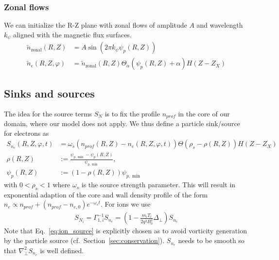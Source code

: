 \subsubsection{Zonal flows}
We can initialize the R-Z plane with zonal flows of amplitude $A$ and
wavelength $k_\psi$ aligned with the magnetic flux surfaces.
\begin{align} \label{eq:initial_zonal_flow}
    \tilde n_{\text{zonal}}(R,Z) &= A \sin (2\pi k_\psi \psi_p(R,Z)) \nonumber\\
\tilde n_e(R,Z,\varphi) &= \tilde n_{\text{zonal}}(R,Z)\Theta_{\alpha}(\psi_p(R, Z)+\alpha) H(Z-Z_X)
\end{align}

\subsection{Sinks and sources} \label{sec:sources}
The idea for the source terms $S_N$ is to fix the profile $n_{prof}$ in the
core of our domain, where our model does not apply.
We thus define a particle sink/source for electrons as
\begin{align} \label{eq:electron_source}
  S_{n_e}(R,Z,\varphi, t) &= \omega_s
    (n_{prof}(R,Z) - n_e(R,Z,\varphi, t))\Theta( \rho_{s} -\rho(R,Z)) H(Z-Z_X)\\
    \rho(R,Z) &:= \frac{\psi_{p,\min}- \psi_p(R,Z) }{\psi_{p,\min}},\\
    \psi_p(R,Z)&:= (1-\rho(R,Z))\psi_{p,\min}
\end{align}
with $0 < \rho_{s}<1$
where $\omega_s$ is the source strength parameter.
This will result in exponential adaption of the core and wall
density profile of the form $n_e \propto n_{prof}+(n_{prof}-n_{e,0})e^{-\omega_st}$.
For ions we use
\begin{align}
    S_{N_i} = \Gamma_{1,i}^{-1} S_{n_e} = \left(1-\frac{m_i T_i}{2q^2 B_0^2} \Delta_\perp\right) S_{n_e}
  \label{eq:ion_source}
\end{align}
Note that Eq.~\eqref{eq:ion_source} is explicitly chosen as to avoid vorticity generation
by the particle source (cf.~Section~\ref{sec:conservation}). $S_{n_e}$ needs to be smooth
so that $\nabla_\perp^2 S_{n_e}$ is well defined.


